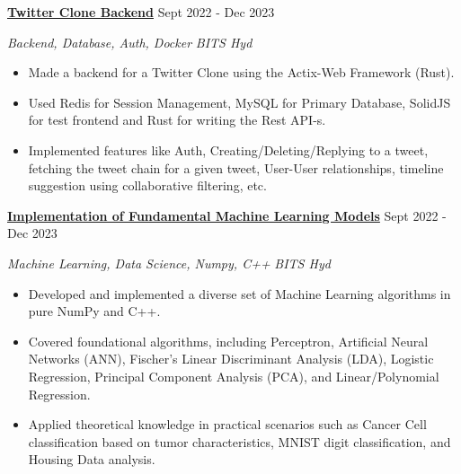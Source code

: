 \documentclass[a4paper,12pt]{report}
\begin{document}
\noindent
\textbf{\href{https://github.com/MSSRPRAD/twitter-clone}{\color{black}Twitter Clone Backend}} \hfill  {\fontsize{12pt}{12pt}\selectfont Sept 2022 - Dec 2023} \par
\par
\noindent 
{\fontsize{12pt}{12pt}\selectfont \textit{Backend, Database, Auth, Docker}\hfill\textit{ BITS Hyd}} \par
\noindent 
\begin{itemize}[noitemsep,topsep=0pt]
    \item {\fontsize{12pt}{12pt}\selectfont Made a backend for a Twitter Clone using the Actix-Web Framework (Rust).} \par
    \item {\fontsize{12pt}{12pt}\selectfont Used Redis for Session Management, MySQL for Primary Database, SolidJS for test frontend and Rust for writing the Rest API-s.} \par
    \item {\fontsize{12pt}{12pt}\selectfont Implemented features like Auth, Creating/Deleting/Replying to a tweet, fetching the tweet chain for a given tweet, User-User relationships, timeline suggestion using collaborative filtering, etc.} \par
\end{itemize}

\noindent 
\textbf{\href{https://github.com/MSSRPRAD/DS-Algorithms}{\color{black}Implementation of Fundamental Machine Learning Models}} \hfill  {\fontsize{12pt}{12pt}\selectfont Sept 2022 - Dec 2023} \par
\noindent
{\fontsize{12pt}{12pt}\selectfont \textit{Machine Learning, Data Science, Numpy, C++}\hfill\textit{ BITS Hyd}} \par
\noindent 
\begin{itemize}[noitemsep,topsep=0pt]
    \item {\fontsize{12pt}{12pt}\selectfont Developed and implemented a diverse set of Machine Learning algorithms in pure NumPy and C++.}  \par
    \item {\fontsize{12pt}{12pt}\selectfont Covered foundational algorithms, including Perceptron, Artificial Neural Networks (ANN), Fischer's Linear Discriminant Analysis (LDA), Logistic Regression, Principal Component Analysis (PCA), and Linear/Polynomial Regression.}  \par
    \item {\fontsize{12pt}{12pt}\selectfont Applied theoretical knowledge in practical scenarios such as Cancer Cell classification based on tumor characteristics, MNIST digit classification, and Housing Data analysis.}  \par
\end{itemize}
\end{document}
